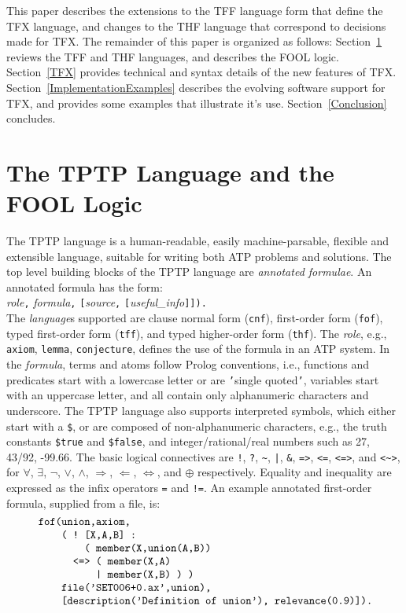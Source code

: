 \documentclass{easychair}
\begin{document}
This paper describes the extensions to the TFF language form that define the 
TFX language, and changes to the THF language that correspond to decisions 
made for TFX.
The remainder of this paper is organized as follows:
Section~\ref{TPTPFOOL} reviews the TFF and THF languages, and
describes the FOOL logic.
Section~\ref{TFX} provides technical and syntax details of the new features 
of TFX.
Section~\ref{ImplementationExamples} describes the evolving software 
support for TFX, and provides some examples that illustrate it's use.
Section~\ref{Conclusion} concludes.

\section{The TPTP Language and the FOOL Logic}
\label{TPTPFOOL}

The TPTP language is a human-readable, easily machine-parsable, flexible and
extensible language, suitable for writing both ATP problems and solutions.
The top level building blocks of the TPTP language are {\em annotated
formulae}.
An annotated formula has the form:\\
{\em role}{\tt ,}
{\em formula}{\tt ,}
{\tt [}{\em source}{\tt ,}
{\tt [}{\em useful\_info}{\tt ]]).}\\
The {\em language}s supported are clause normal form ({\tt cnf}),
first-order form ({\tt fof}), typed first-order form ({\tt tff}), and
typed higher-order form ({\tt thf}).
The {\em role}, e.g., {\tt axiom}, {\tt lemma}, {\tt conjecture},
defines the use of the formula in an ATP system.
In the {\em formula}, terms and atoms follow Prolog conventions, i.e.,
functions and predicates start with a lowercase letter or are {\tt '}single
quoted{\tt '}, variables start with an uppercase letter, and all
contain only alphanumeric characters and underscore.
The TPTP language also supports interpreted symbols, which either start with a
{\tt \$}, or are composed of non-alphanumeric characters, e.g., the truth
constants {\tt \$true} and {\tt \$false}, and integer/rational/real
numbers such as 27, 43/92, -99.66.
The basic logical connectives are
{\tt !}, {\tt ?}, {\tt \verb|~|}, {\tt |}, {\tt \&}, {\tt =>}, {\tt <=},
{\tt <=>}, and {\tt <\verb|~|>},
for
$\forall$, $\exists$, $\neg$, $\vee$, $\wedge$, $\Rightarrow$, $\Leftarrow$,
$\Leftrightarrow$, and $\oplus$ respectively.
Equality and inequality are expressed as the infix operators {\tt =} and
{\tt !=}.
An example annotated first-order formula, supplied from a file, is:
\[
\begin{minipage}{\textwidth}
\begin{verbatim}
    fof(union,axiom,
        ( ! [X,A,B] :
            ( member(X,union(A,B))
          <=> ( member(X,A)
              | member(X,B) ) )
        file('SET006+0.ax',union),
        [description('Definition of union'), relevance(0.9)]).
\end{verbatim}
\end{minipage}
\]
\end{document}
